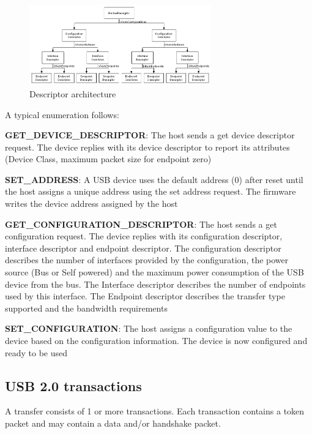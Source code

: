\documentclass[pdftex,10pt,a4paper]{report}
\newenvironment{packed_item}{
\begin{itemize}
  \setlength{\itemsep}{1pt}
  \setlength{\parskip}{0pt}
  \setlength{\parsep}{0pt}
}{\end{itemize}}
\begin{document}
\begin{figure}[h!]
		\centering
		\includegraphics[width=0.7\textwidth]{./descr.jpg}
		\caption{Descriptor architecture}
		\label{Descriptor architecture}
\end{figure}

A typical enumeration follows:
\begin{packed_item}
	\item \textbf{GET\_DEVICE\_DESCRIPTOR}: The host sends a get device descriptor request. The device
replies with its device descriptor to report its attributes (Device Class, maximum packet size for endpoint zero)
	\item \textbf{SET\_ADDRESS}: A USB device uses the default address (0) after reset until the host assigns a unique address using the set address request. The firmware writes the device address assigned by the host
	\item \textbf{GET\_CONFIGURATION\_DESCRIPTOR}: The host sends a get configuration request. The device replies with its configuration descriptor, interface descriptor and endpoint descriptor. The configuration descriptor describes the number of interfaces provided by the configuration, the power source
(Bus or Self powered) and the maximum power consumption of the USB device from the bus.
The Interface descriptor describes the number of endpoints used by this interface. The Endpoint
descriptor describes the transfer type supported and the bandwidth requirements
	\item \textbf{SET\_CONFIGURATION}: The host assigns a configuration value to the device based on the
configuration information. The device is now configured and ready to be used
\end{packed_item}


\subsection{USB 2.0 transactions}
A transfer consists of 1 or more transactions. Each transaction contains a token packet and may contain a data and/or handshake packet.
\end{document}
